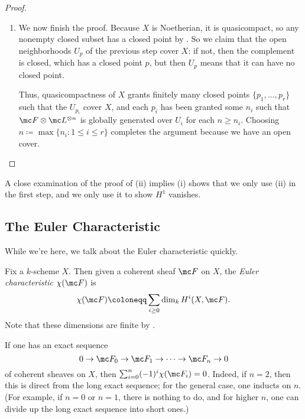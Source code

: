 \documentclass[../notes.tex]{subfiles}
\begin{document}
\begin{proof}
\begin{enumerate}
		\item We now finish the proof. Because $X$ is Noetherian, it is quasicompact, so any nonempty closed subset has a closed point by . So we claim that the open neighborhoods $U_p$ of the previous step cover $X$: if not, then the complement is closed, which has a closed point $p$, but then $U_p$ means that it can have no closed point.

		Thus, quasicompactness of $X$ grants finitely many closed points $\{p_1,\ldots,p_r\}$ such that the $U_{p_i}$ cover $X$, and each $p_i$ has been granted some $n_i$ such that $\mc F\otimes\mc L^{\otimes n}$ is globally generated over $U_i$ for each $n\ge n_i$. Choosing $n\coloneqq\max\{n_i:1\le i\le r\}$ completes the argument because we have an open cover.
		\qedhere
	\end{enumerate}
\end{proof}
\begin{remark}
	A close examination of the proof of (ii) implies (i) shows that we only use (ii) in the first step, and we only use it to show $H^1$ vanishes.
\end{remark}

\subsection{The Euler Characteristic}
While we're here, we talk about the Euler characteristic quickly.
\begin{definition}
	Fix a $k$-scheme $X$. Then given a coherent sheaf $\mc F$ on $X$, the \textit{Euler characteristic} $\chi(\mc F)$ is
	\[\chi(\mc F)\coloneqq\sum_{i\ge0}\dim_kH^i(X,\mc F).\]
	Note that these dimensions are finite by .
\end{definition}
\begin{remark} \label{rem:euler-char-additive}
	If one has an exact sequence
	\[0\to\mc F_0\to\mc F_1\to\cdots\to\mc F_n\to0\]
	of coherent sheaves on $X$, then $\sum_{i=0}^n(-1)^i\chi(\mc F_i)=0$. Indeed, if $n=2$, then this is direct from the long exact sequence; for the general case, one inducts on $n$. (For example, if $n=0$ or $n=1$, there is nothing to do, and for higher $n$, one can divide up the long exact sequence into short ones.)
\end{remark}
\end{document}
